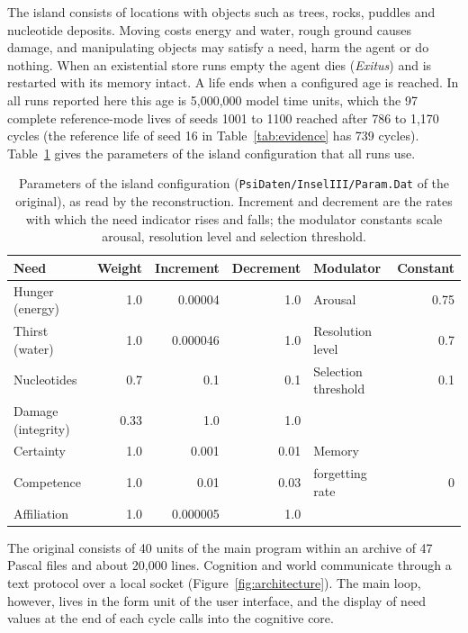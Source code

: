 \documentclass[preprint,12pt,authoryear]{elsarticle}
\newcommand{\code}[1]{\texttt{#1}}
\begin{document}
The island consists of locations with objects such as trees, rocks, puddles and nucleotide deposits. Moving costs energy and water, rough ground causes damage, and manipulating objects may satisfy a need, harm the agent or do nothing. When an existential store runs empty the agent dies (\emph{Exitus}) and is restarted with its memory intact. A life ends when a configured age is reached. In all runs reported here this age is 5{,}000{,}000 model time units, which the 97 complete reference-mode lives of seeds 1001 to 1100 reached after 786 to 1{,}170 cycles (the reference life of seed 16 in Table~\ref{tab:evidence} has 739 cycles). Table~\ref{tab:params} gives the parameters of the island configuration that all runs use.

\begin{table}[t]
\centering
\caption{Parameters of the island configuration (\code{PsiDaten/InselIII/Param.Dat} of the original), as read by the reconstruction. Increment and decrement are the rates with which the need indicator rises and falls; the modulator constants scale arousal, resolution level and selection threshold.}
\label{tab:params}
\small
\begin{tabular}{lrrr@{\hspace{2.5em}}lr}
\toprule
Need & Weight & Increment & Decrement & Modulator & Constant \\
\midrule
Hunger (energy) & 1.0 & 0.00004 & 1.0 & Arousal & 0.75 \\
Thirst (water) & 1.0 & 0.000046 & 1.0 & Resolution level & 0.7 \\
Nucleotides & 0.7 & 0.1 & 0.1 & Selection threshold & 0.1 \\
Damage (integrity) & 0.33 & 1.0 & 1.0 & & \\
Certainty & 1.0 & 0.001 & 0.01 & Memory & \\
Competence & 1.0 & 0.01 & 0.03 & \quad forgetting rate & 0 \\
Affiliation & 1.0 & 0.000005 & 1.0 & & \\
\bottomrule
\end{tabular}
\end{table}

The original consists of 40 units of the main program within an archive of 47 Pascal files and about 20{,}000 lines. Cognition and world communicate through a text protocol over a local socket (Figure~\ref{fig:architecture}). The main loop, however, lives in the form unit of the user interface, and the display of need values at the end of each cycle calls into the cognitive core.
\end{document}
